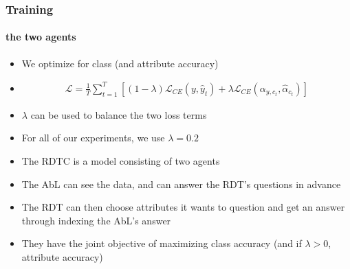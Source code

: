 \documentclass[9pt]{beamer}
\begin{document}
\begin{frame}
\frametitle{Training}
\framesubtitle{the two agents}
\begin{itemize}
	\item We optimize for class (and attribute accuracy)
	\item \begin{align*}
	\mathcal{L} = \frac{1}{T}\sum_{t=1}^{T}\left[(1-\lambda)\mathcal{L}_{CE}(y,\hat{y}_t) + \lambda \mathcal{L}_{CE}(\alpha_{y,c_t},\hat{\alpha}_{c_t}) \right]
	\end{align*}
	\item $\lambda$ can be used to balance the two loss terms
	\item For all of our experiments, we use $\lambda=0.2$
\end{itemize}
\end{frame}



\begin{frame}[plain]
\begin{itemize}
	\item The RDTC is a model consisting of two agents
	\item The AbL can see the data, and can answer the RDT's questions in advance
	\item The RDT can then choose attributes it wants to question and get an answer through indexing the AbL's answer
	\item They have the joint objective of maximizing class accuracy (and if $\lambda>0$, attribute accuracy)
\end{itemize}
\end{frame}
\end{document}
